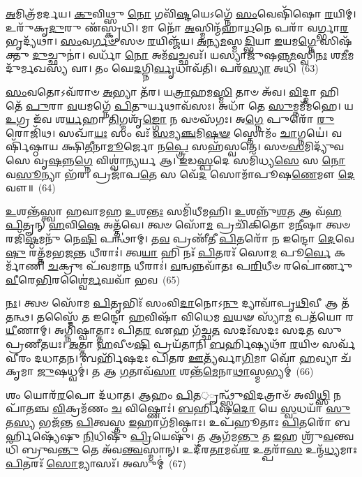 \-\ul{𑌅}\-𑌮𑌿𑌤𑍍𑌰᳴𑌮𑌰𑍍𑌦𑌯। \ul{𑌕𑍁}\-𑌵𑌿𑌥𑍍𑌸𑍁 \ul{𑌨𑍋} 𑌗𑌵𑌿᳴\-\ul{𑌷𑍍𑌟}\-𑌯𑍇\-𑌽𑌗𑍍𑌨𑍇᳴ \ul{𑌸𑌂}\-𑌵𑍇𑌷𑌿᳴𑌷𑍋 \ul{𑌰}\-𑌯𑌿𑌮𑍍। 𑌉𑌰𑍁᳴𑌕𑍃\-\ul{𑌦𑍁}\-𑌰𑍁 𑌣᳴𑌸𑍍𑌕𑍃𑌧𑌿। 𑌮𑌾 𑌨𑍋᳴ \ul{𑌅}\-𑌸𑍍𑌮𑌿𑌨𑍍𑌮᳴𑌹𑌾\-\ul{𑌧}\-𑌨𑍇 𑌪𑌰𑌾᳴ 𑌵𑌰𑍍𑌗𑍍𑌭𑌾\-\ul{𑌰}\-𑌭𑍃𑌦𑍍𑌯᳴𑌥𑌾। \ul{𑌸𑌂}\-𑌵\-\ul{𑌰𑍍𑌗}\-\-\ul{𑍞} 𑌸𑍞 \ul{𑌰}\-𑌯𑌿𑌞𑍍𑌜᳴𑌯। \ul{𑌅}\-𑌨𑍍𑌯\-\ul{𑌮}\-𑌸𑍍𑌮\-\ul{𑌦𑍍𑌭𑌿}\-𑌯𑌾 \ul{𑌇}\-𑌯𑌮\-\ul{𑌗𑍍𑌨𑍇} 𑌸𑌿𑌷᳴𑌕𑍍𑌤𑍁 \ul{𑌦𑍁}\-𑌚𑍍𑌛𑍁𑌨𑌾॑। 𑌵𑌰𑍍𑌧𑌾᳴ \ul{𑌨𑍋} 𑌅𑌮᳴\-\ul{𑌵}\-𑌚𑍍𑌛𑌵𑌃᳴। 𑌯𑌸𑍍𑌯𑌾𑌜𑍁᳴𑌷𑌨𑍍𑌨\-\ul{𑌮}\-𑌸𑍍𑌵𑌿\-\ul{𑌨𑌃} 𑌶\-\ul{𑌮𑍀}\-𑌮𑌦𑍁᳴𑌰𑍍𑌮𑌖𑌸𑍍𑌯 𑌵𑌾। 𑌤𑌂 𑌘𑍇\-\ul{𑌦}\-𑌗𑍍𑌨𑌿\-\ul{𑌰𑍍𑌵𑍃}\-𑌧𑌾𑌵᳴𑌤𑌿। 𑌪𑌰᳴\-\ul{𑌸𑍍𑌯𑌾} 𑌅𑌧𑌿᳴~(63)

\-\ul{𑌸𑌂}\-𑌵𑌤𑍋\-𑌽𑌵᳴𑌰𑌾𑍞 \ul{𑌅}\-𑌭𑍍𑌯𑌾 𑌤᳴𑌰। 𑌯\-\ul{𑌤𑍍𑌰𑌾}\-𑌹𑌮\-\ul{𑌸𑍍𑌮𑌿} 𑌤𑌾𑍞 𑌅᳴𑌵। \ul{𑌵𑌿}\-𑌦𑍍𑌮𑌾 𑌹𑌿 𑌤𑍇᳴ \ul{𑌪𑍁}\-𑌰𑌾 \ul{𑌵}\-𑌯𑌮𑌗𑍍𑌨𑍇᳴ \ul{𑌪𑌿}\-𑌤𑍁𑌰𑍍𑌯𑌥𑌾𑌵᳴𑌸𑌃। 𑌅𑌧𑌾᳴ 𑌤𑍇 \ul{𑌸𑍁}\-𑌮𑍍𑌨𑌮𑍀᳴𑌮𑌹𑍇। 𑌯 \ul{𑌉}\-𑌗𑍍𑌰 𑌇᳴𑌵 𑌶\-\ul{𑌰𑍍𑌯}\-𑌹𑌾 \ul{𑌤𑌿}\-𑌗𑍍𑌮𑌶𑍃᳴\-\ul{𑌙𑍍𑌗𑍋} 𑌨 𑌵𑍞𑌸᳴𑌗𑌃। 𑌅\-\ul{𑌗𑍍𑌨𑍇} 𑌪𑍁𑌰𑍋᳴ \ul{𑌰𑍁}\-𑌰𑍋𑌜𑌿᳴𑌥। 𑌸𑌖𑌾᳴\-\ul{𑌯𑌃} 𑌸𑌂 𑌵𑌃᳴ \ul{𑌸}\-𑌮𑍍𑌯\-\ul{𑌞𑍍𑌚}\-𑌮𑌿\-\ul{𑌷}\-\-\ul{𑍟} 𑌸𑍍𑌤𑍋𑌮𑌂᳴ \ul{𑌚𑌾}\-𑌗𑍍𑌨𑌯𑍇॑। 𑌵𑌰𑍍\mbox{}𑌷𑌿᳴𑌷𑍍𑌠𑌾𑌯 𑌕𑍍𑌷𑌿\-\ul{𑌤𑍀}\-𑌨𑌾\-\ul{𑌮𑍂}\-𑌰𑍍𑌜𑍋 𑌨\-\ul{𑌪𑍍𑌤𑍍𑌰𑍇} 𑌸𑌹᳴𑌸𑍍𑌵𑌤𑍇। 𑌸𑍞\-\ul{𑌸}\-𑌮𑌿𑌦𑍍𑌯𑍁᳴𑌵𑌸𑍇 𑌵𑍃\-\ul{𑌷}\-𑌨𑍍𑌨\-\ul{𑌗𑍍𑌨𑍇} 𑌵𑌿𑌶𑍍𑌵𑌾॑\-\ul{𑌨𑍍𑌯}\-𑌰𑍍𑌯 𑌆। \ul{𑌇}\-𑌡\-\ul{𑌸𑍍𑌪}\-𑌦𑍇 𑌸𑌮𑌿᳴𑌧𑍍𑌯\-\ul{𑌸𑍇} 𑌸 \ul{𑌨𑍋} 𑌵\-\ul{𑌸𑍂}\-𑌨𑍍𑌯𑌾 𑌭᳴𑌰। 𑌪𑍍𑌰𑌜𑌾᳴𑌪\-\ul{𑌤𑍇} 𑌸 𑌵𑍇᳴\-\ul{𑌦} 𑌸𑍋𑌮𑌾᳴𑌪𑍂𑌷\-\ul{𑌣𑍇}\-𑌮𑍗 \ul{𑌦𑍇}\-𑌵𑍗॥~(64)

{\anuvakamend[{\-\ul{𑌯}\-𑌜𑍍𑌞𑌮\-\ul{𑌮𑍈}\-𑌰𑌧𑌿᳴ 𑌵𑍃\-\ul{𑌷}\-𑌨𑍍𑌨𑍇\-\ul{𑌕𑌾}\-𑌨𑍍𑌨𑌵𑌿𑍞᳴\-\ul{𑌶}\-𑌤𑌿𑌶𑍍𑌚᳴}]}%

\-\ul{𑌉}\-𑌶𑌨𑍍𑌤᳴𑌸𑍍𑌤𑍍𑌵𑌾 𑌹𑌵𑌾𑌮𑌹 \ul{𑌉}\-𑌶\-\ul{𑌨𑍍𑌤𑌃} 𑌸𑌮𑌿᳴𑌧𑍀𑌮𑌹𑌿। \ul{𑌉}\-𑌶𑌨𑍍𑌨𑍁᳴\-\ul{𑌶}\-𑌤 𑌆 𑌵᳴\-\ul{𑌹} \ul{𑌪𑌿}\-𑌤𑍄𑌨𑍍 \ul{𑌹}\-𑌵𑌿\-\ul{𑌷𑍇} 𑌅𑌤𑍍𑌤᳴𑌵𑍇। 𑌤𑍍𑌵𑍞 𑌸𑍋᳴\-\ul{𑌮} 𑌪𑍍𑌰𑌚𑌿᳴𑌕𑌿𑌤𑍋 𑌮\-\ul{𑌨𑍀}\-𑌷𑌾 𑌤𑍍𑌵𑍞 𑌰𑌜𑌿᳴\-\ul{𑌷𑍍𑌠}\-𑌮𑌨𑍁᳴ 𑌨𑍇\-\ul{𑌷𑌿} 𑌪𑌨𑍍𑌥𑌾॑𑌮𑍍। 𑌤\-\ul{𑌵} 𑌪𑍍𑌰𑌣𑍀᳴𑌤𑍀 \ul{𑌪𑌿}\-𑌤𑌰𑍋᳴ 𑌨 𑌇𑌨𑍍𑌦𑍋 \ul{𑌦𑍇}\-𑌵𑍇\-\ul{𑌷𑍁} 𑌰𑌤𑍍𑌨᳴𑌮𑌭𑌜\-\ul{𑌨𑍍𑌤} 𑌧𑍀𑌰𑌾𑌃॑। 𑌤𑍍𑌵\-\ul{𑌯𑌾} 𑌹𑌿 𑌨𑌃᳴ \ul{𑌪𑌿}\-𑌤𑌰𑌃᳴ 𑌸𑍋\-\ul{𑌮} 𑌪𑍂\-\ul{𑌰𑍍𑌵𑍇} 𑌕𑌰𑍍𑌮𑌾᳴𑌣𑌿 \ul{𑌚}\-𑌕𑍍𑌰𑍁𑌃 𑌪᳴𑌵𑌮𑌾\-\ul{𑌨} 𑌧𑍀𑌰𑌾𑌃॑। \ul{𑌵}\-𑌨𑍍𑌵𑌨𑍍𑌨𑌵𑌾᳴𑌤𑌃 𑌪\-\ul{𑌰𑌿}\-𑌧𑍀𑍞 𑌰𑌪𑍋॑𑌰𑍍𑌣𑍁 \ul{𑌵𑍀}\-𑌰𑍇\-\ul{𑌭𑌿}\-𑌰𑌶𑍍𑌵𑍈॑\-\ul{𑌰𑍍𑌮}\-𑌘𑌵𑌾᳴ 𑌭𑌵~(65)

\-\ul{𑌨𑌃}\-। 𑌤𑍍𑌵𑍞 𑌸𑍋᳴𑌮 \ul{𑌪𑌿}\-𑌤𑍃𑌭𑌿𑌃᳴ 𑌸𑌂𑌵𑌿\-\ul{𑌦𑌾}\-𑌨𑍋\-𑌽\-\ul{𑌨𑍁} 𑌦𑍍𑌯𑌾𑌵𑌾᳴𑌪𑍃\-\ul{𑌥𑌿}\-𑌵𑍀 𑌆 𑌤᳴𑌤𑌨𑍍𑌥। 𑌤𑌸𑍍𑌮𑍈᳴ 𑌤 𑌇𑌨𑍍𑌦𑍋 \ul{𑌹}\-𑌵𑌿𑌷𑌾᳴ 𑌵𑌿𑌧𑍇𑌮 \ul{𑌵}\-𑌯𑍟 𑌸𑍍𑌯𑌾᳴\-\ul{𑌮} 𑌪𑌤᳴𑌯𑍋 𑌰\-\ul{𑌯𑍀}\-𑌣𑌾𑌮𑍍। 𑌅𑌗𑍍𑌨𑌿᳴𑌷𑍍𑌵𑌾𑌤𑍍𑌤𑌾𑌃 𑌪𑌿𑌤\-\ul{𑌰} 𑌏𑌹 𑌗᳴𑌚𑍍𑌛\-\ul{𑌤} 𑌸𑌦𑌃᳴𑌸𑌦𑌃 𑌸𑌦𑌤 𑌸𑍁𑌪𑍍𑌰𑌣𑍀𑌤𑌯𑌃। \ul{𑌅}\-𑌤𑍍𑌤𑌾 \ul{𑌹}\-𑌵𑍀𑍞\-\ul{𑌷𑌿} 𑌪𑍍𑌰𑌯᳴𑌤𑌾𑌨𑌿 \ul{𑌬}\-𑌰𑍍\mbox{}𑌹𑌿𑌷𑍍𑌯𑌥𑌾᳴ \ul{𑌰}\-𑌯𑌿𑍞 𑌸𑌰𑍍𑌵᳴𑌵𑍀𑌰𑌂 𑌦𑌧𑌾𑌤𑌨। 𑌬𑌰𑍍\mbox{}𑌹𑌿᳴𑌷𑌦𑌃 𑌪𑌿𑌤𑌰 \ul{𑌊}\-𑌤𑍍𑌯᳴𑌰𑍍𑌵𑌾\-\ul{𑌗𑌿}\-𑌮𑌾 𑌵𑍋᳴ \ul{𑌹}\-𑌵𑍍𑌯𑌾 𑌚᳴𑌕𑍃𑌮𑌾 \ul{𑌜𑍁}\-𑌷𑌧𑍍𑌵𑌮𑍍॑। 𑌤 𑌆 \ul{𑌗}\-𑌤𑌾𑌵᳴\-\ul{𑌸𑌾} 𑌶𑌨𑍍𑌤᳴\-\ul{𑌮𑍇}\-𑌨𑌾\-\ul{𑌥𑌾}\-𑌸𑍍𑌮𑌭𑍍𑌯𑌮𑍍॑~(66)

𑌶𑌂 𑌯𑍋𑌰᳴\-\ul{𑌰}\-𑌪𑍋 𑌦᳴𑌧𑌾𑌤। 𑌆𑌹𑌂 \ul{𑌪𑌿}\-𑌤़𑍄𑌨𑍍𑌥𑍍𑌸𑍁᳴\-\ul{𑌵𑌿}\-𑌦𑌤𑍍𑌰𑌾𑍞᳴ 𑌅𑌵𑌿\-\ul{𑌥𑍍𑌸𑌿} 𑌨𑌪𑌾᳴𑌤𑌞𑍍𑌚 \ul{𑌵𑌿}\-𑌕𑍍𑌰𑌮᳴𑌣𑌂 \ul{𑌚} 𑌵𑌿𑌷𑍍𑌣𑍋𑌃॑। \ul{𑌬}\-𑌰𑍍\mbox{}\-\ul{𑌹𑌿}\-𑌷\-\ul{𑌦𑍋} 𑌯𑍇 \ul{𑌸𑍍𑌵}\-𑌧𑌯𑌾᳴ \ul{𑌸𑍁}\-𑌤\-\ul{𑌸𑍍𑌯} 𑌭𑌜᳴𑌨𑍍𑌤 \ul{𑌪𑌿}\-𑌤𑍍𑌵𑌸𑍍𑌤 \ul{𑌇}\-𑌹𑌾𑌗᳴𑌮𑌿𑌷𑍍𑌠𑌾𑌃। 𑌉𑌪᳴𑌹𑍂𑌤𑌾𑌃 \ul{𑌪𑌿}\-𑌤𑌰𑍋᳴ 𑌬𑌰𑍍\mbox{}\-\ul{𑌹𑌿}\-𑌷𑍍𑌯𑍇᳴𑌷𑍁 \ul{𑌨𑌿}\-𑌧𑌿𑌷𑍁᳴ \ul{𑌪𑍍𑌰𑌿}\-𑌯𑍇𑌷𑍁᳴। 𑌤 𑌆𑌗᳴𑌮\-\ul{𑌨𑍍𑌤𑍁} 𑌤 \ul{𑌇}\-𑌹 𑌶𑍍𑌰𑍁᳴\-\ul{𑌵}\-𑌨𑍍𑌤𑍍𑌵𑌧𑌿᳴ 𑌬𑍍𑌰𑍁𑌵\-\ul{𑌨𑍍𑌤𑍁} 𑌤𑍇 𑌅᳴𑌵\-\ul{𑌨𑍍𑌤𑍍𑌵}\-𑌸𑍍𑌮𑌾𑌨𑍍। 𑌉𑌦𑍀᳴𑌰\-\ul{𑌤𑌾}\-𑌮𑌵᳴\-\ul{𑌰} 𑌉𑌤𑍍𑌪𑌰𑌾᳴\-\ul{𑌸} 𑌉𑌨𑍍𑌮᳴\-\ul{𑌧𑍍𑌯}\-𑌮𑌾𑌃 \ul{𑌪𑌿}\-𑌤𑌰𑌃᳴ \ul{𑌸𑍋}\-𑌮𑍍𑌯𑌾𑌸𑌃᳴। 𑌅𑌸𑍁𑌮𑍍॑~(67)

